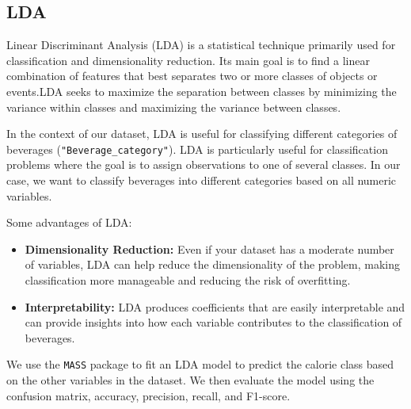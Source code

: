 \documentclass[
]{article}
\newenvironment{Shaded}{\begin{snugshade}}{\end{snugshade}}
\newcommand{\AttributeTok}[1]{\textcolor[rgb]{0.13,0.29,0.53}{#1}}
\newcommand{\FunctionTok}[1]{\textcolor[rgb]{0.13,0.29,0.53}{\textbf{#1}}}
\newcommand{\NormalTok}[1]{#1}
\newcommand{\OtherTok}[1]{\textcolor[rgb]{0.56,0.35,0.01}{#1}}
\newcommand{\SpecialCharTok}[1]{\textcolor[rgb]{0.81,0.36,0.00}{\textbf{#1}}}
\begin{document}
\subsection{LDA}\label{lda}

Linear Discriminant Analysis (LDA) is a statistical technique primarily
used for classification and dimensionality reduction. Its main goal is
to find a linear combination of features that best separates two or more
classes of objects or events.LDA seeks to maximize the separation
between classes by minimizing the variance within classes and maximizing
the variance between classes.

In the context of our dataset, LDA is useful for classifying different
categories of beverages (\texttt{"Beverage\_category"}). LDA is
particularly useful for classification problems where the goal is to
assign observations to one of several classes. In our case, we want to
classify beverages into different categories based on all numeric
variables.

Some advantages of LDA:

\begin{itemize}
\item
  \textbf{Dimensionality Reduction:} Even if your dataset has a moderate
  number of variables, LDA can help reduce the dimensionality of the
  problem, making classification more manageable and reducing the risk
  of overfitting.
\item
  \textbf{Interpretability:} LDA produces coefficients that are easily
  interpretable and can provide insights into how each variable
  contributes to the classification of beverages.
\end{itemize}

We use the \texttt{MASS} package to fit an LDA model to predict the
calorie class based on the other variables in the dataset. We then
evaluate the model using the confusion matrix, accuracy, precision,
recall, and F1-score.

\begin{Shaded}
\end{Shaded}
\end{document}
